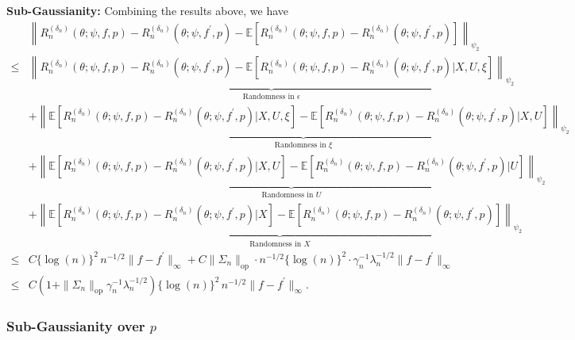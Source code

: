\documentclass[12pt]{article}
\newcommand{\E}{\mathbb{E}}
\begin{document}
\noindent \textbf{Sub-Gaussianity:} Combining the results above, we have
\begin{align*}
    &\left\|R_n^{(\delta_n)}(\theta;\psi,f,p)-R_n^{({\delta_n})}(\theta;\psi,f^\prime,p)-\E\left[R_n^{(\delta_n)}(\theta;\psi,f,p)-R_n^{({\delta_n})}(\theta;\psi,f^\prime,p)\right]\right\|_{\psi_2}\\
    \leq & \underbrace{\left\|R_n^{(\delta_n)}(\theta;\psi,f,p)-R_n^{({\delta_n})}(\theta;\psi,f^\prime,p)-\E\left[R_n^{(\delta_n)}(\theta;\psi,f,p)-R_n^{({\delta_n})}(\theta;\psi,f^\prime,p)|X,U,\xi\right]\right\|_{\psi_2}}_{\text{Randomness in $\epsilon$}}\\
    & + \underbrace{\left\|\E\left[R_n^{(\delta_n)}(\theta;\psi,f,p)-R_n^{({\delta_n})}(\theta;\psi,f^\prime,p)|X,U,\xi\right]-\E\left[R_n^{(\delta_n)}(\theta;\psi,f,p)-R_n^{({\delta_n})}(\theta;\psi,f^\prime,p)|X,U\right]\right\|_{\psi_2}}_{\text{Randomness in $\xi$}}\\
    & + \underbrace{\left\|\E\left[R_n^{(\delta_n)}(\theta;\psi,f,p)-R_n^{({\delta_n})}(\theta;\psi,f^\prime,p)|X,U\right]-\E\left[R_n^{(\delta_n)}(\theta;\psi,f,p)-R_n^{({\delta_n})}(\theta;\psi,f^\prime,p)|U\right]\right\|_{\psi_2}}_{\text{Randomness in $U$}}\\
    & + \underbrace{\left\|\E\left[R_n^{(\delta_n)}(\theta;\psi,f,p)-R_n^{({\delta_n})}(\theta;\psi,f^\prime,p)|X\right]-\E\left[R_n^{(\delta_n)}(\theta;\psi,f,p)-R_n^{({\delta_n})}(\theta;\psi,f^\prime,p)\right]\right\|_{\psi_2}}_{\text{Randomness in $X$}}\\
    \leq & C\{\log(n)\}^2\,n^{-1/2}\|f-f^\prime\|_\infty + C\|\Sigma_n\|_{\mathrm{op}}\cdot n^{-1/2}\{\log(n)\}^2\cdot\gamma_n^{-1}\lambda_n^{-1/2}\|f-f^\prime\|_\infty\\
    \leq & C\left(1+\|\Sigma_n\|_{\mathrm{op}}\gamma_n^{-1}\lambda_n^{-1/2}\right)\{\log(n)\}^2\,n^{-1/2}\|f-f^\prime\|_\infty.
\end{align*}


\subsubsection{Sub-Gaussianity over $p$}
\end{document}

